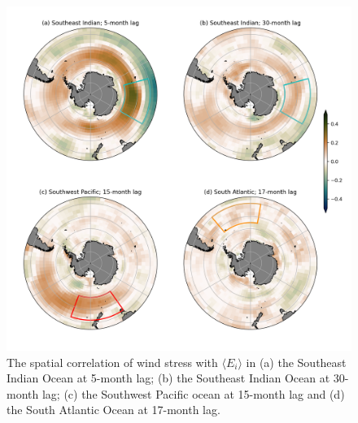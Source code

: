 \documentclass[linenumbers]{agujournal2019}
\begin{document}
\begin{figure}[t]
\begin{center}
\includegraphics[width=\hsize]{Figure5}
\caption{The spatial correlation of wind stress with $\langle E_i \rangle$ in (a) the Southeast Indian Ocean at 5-month lag; (b) the Southeast Indian Ocean at 30-month lag; (c) the Southwest Pacific ocean at 15-month lag and (d) the South Atlantic Ocean at 17-month lag.}
\label{Fig:5}
\end{center}
\end{figure}
\end{document}
